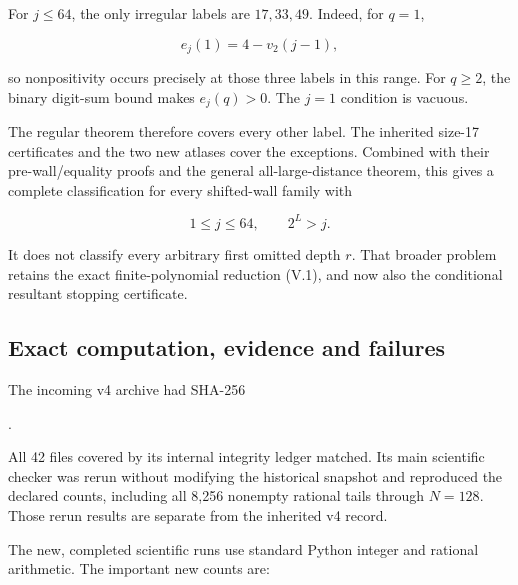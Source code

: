 \documentclass[11pt,letterpaper]{article}
\begin{document}
For \(j\le64\), the only irregular labels are \(17,33,49\). Indeed, for \(q=1\),

\[
e_j(1)=4-v_2(j-1),
\]

so nonpositivity occurs precisely at those three labels in this range. For \(q\ge2\), the binary digit-sum bound makes \(e_j(q)>0\). The \(j=1\) condition is vacuous.

The regular theorem therefore covers every other label. The inherited size-17 certificates and the two new atlases cover the exceptions. Combined with their pre-wall/equality proofs and the general all-large-distance theorem, this gives a complete classification for every shifted-wall family with

\[
\boxed{1\le j\le64,\qquad 2^L>j.}
\]

It does not classify every arbitrary first omitted depth \(r\). That broader problem retains the exact finite-polynomial reduction (V.1), and now also the conditional resultant stopping certificate.

\subsection{Exact computation, evidence and failures}\label{exact-computation-evidence-and-failures}

The incoming v4 archive had SHA-256

.

All 42 files covered by its internal integrity ledger matched. Its main scientific checker was rerun without modifying the historical snapshot and reproduced the declared counts, including all 8,256 nonempty rational tails through \(N=128\). Those rerun results are separate from the inherited v4 record.

The new, completed scientific runs use standard Python integer and rational arithmetic. The important new counts are:
\end{document}
